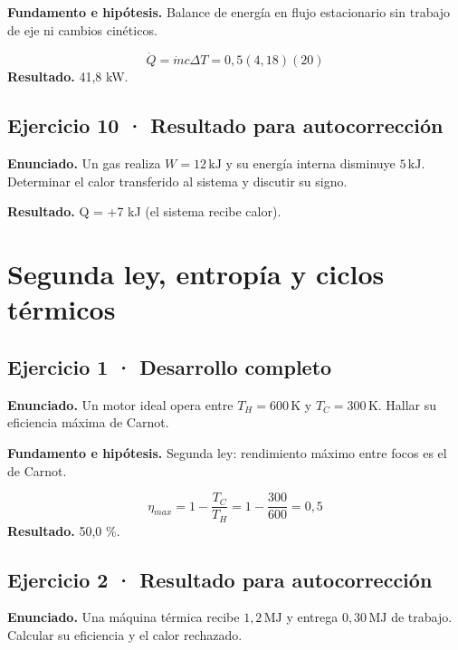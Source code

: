 \documentclass[11pt,a4paper]{article}
\begin{document}
\textbf{Fundamento e hipótesis.} Balance de energía en flujo estacionario sin trabajo de eje ni cambios cinéticos.

\[
\dot Q=\dot mc\Delta T=0{,}5(4{,}18)(20)
\]
\textbf{Resultado.} 41,8 kW.


\subsection*{Ejercicio 10 · Resultado para autocorrección}
\textbf{Enunciado.} Un gas realiza \(W=12\,\mathrm{kJ}\) y su energía interna disminuye \(5\,\mathrm{kJ}\). Determinar el calor transferido al sistema y discutir su signo.

\textbf{Resultado.} Q = +7 kJ (el sistema recibe calor).


\clearpage

\section{Segunda ley, entropía y ciclos térmicos}

\begin{center}\end{center}

\subsection*{Ejercicio 1 · Desarrollo completo}
\textbf{Enunciado.} Un motor ideal opera entre \(T_H=600\,\mathrm K\) y \(T_C=300\,\mathrm K\). Hallar su eficiencia máxima de Carnot.

\textbf{Fundamento e hipótesis.} Segunda ley: rendimiento máximo entre focos es el de Carnot.

\[
\eta_{max}=1-\frac{T_C}{T_H}=1-\frac{300}{600}=0{,}5
\]
\textbf{Resultado.} 50,0 \%.


\subsection*{Ejercicio 2 · Resultado para autocorrección}
\textbf{Enunciado.} Una máquina térmica recibe \(1{,}2\,\mathrm{MJ}\) y entrega \(0{,}30\,\mathrm{MJ}\) de trabajo. Calcular su eficiencia y el calor rechazado.
\end{document}
